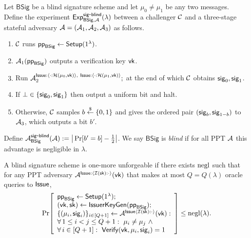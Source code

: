 \begin{definition}[Blindness]\label{def:bs-blindness}
  Let $\mathsf{BSig}$ be a blind signature scheme and let $\mu_0 \neq \mu_1$ be any two messages. Define the
  experiment $\mathsf{Exp}^{\mathsf{sig\mbox{-}blind}}_{\mathsf{BSig},\mathcal{A}}(\lambda)$ between a challenger
  $\mathcal{C}$ and a three-stage stateful adversary $\mathcal{A}=(\mathcal{A}_1,\mathcal{A}_2,\mathcal{A}_3)$ as follows.
 \begin{enumerate}[leftmargin=1.25em]
   \item $\mathcal{C}$ runs $\mathsf{pp}_{\mathsf{BSig}}\gets \mathsf{Setup}(1^\lambda)$.
   \item $\mathcal{A}_1(\mathsf{pp}_{\mathsf{BSig}})$ outputs a verification key $\mathsf{vk}$.
	   \item Run
			$\mathcal{A}_2^{\mathsf{Issue}:\langle \cdot: \mathcal{H}(\mu_0,\mathsf{vk})\rangle ,~ \mathsf{Issue}:\langle
	    \cdot: \mathcal{H}(\mu_1,\mathsf{vk})\rangle };$
	     at the end of which $\mathcal{C}$ obtains $\mathsf{sig}_0,\mathsf{sig}_1$.
	   \item If $\bot\in\{\mathsf{sig}_0,\mathsf{sig}_1\}$ then output a uniform bit and halt.
	   \item Otherwise, $\mathcal{C}$ samples $b\overset{\$}{\leftarrow}\{0,1\}$ and gives the ordered pair
	   \((\mathsf{sig}_b,\mathsf{sig}_{1-b})\) to $\mathcal{A}_3$, which
	   outputs a bit $b'$.
	 \end{enumerate}
 Define $\mathcal{A}^{\mathsf{sig\mbox{-}blind}}_{\mathsf{BSig}}(\mathcal{A}) := \big|\Pr[b'=b]-\tfrac12\big|$.
 We say $\mathsf{BSig}$ is \emph{blind} if for all PPT $\mathcal{A}$ this advantage is negligible in $\lambda$.
\end{definition}



\begin{definition}\label{def:bs-euf-cma}
A blind signature scheme is one-more unforgeable if there exists \(\mathrm{negl}\) such that for any PPT adversary
\(\mathcal{A}^{\mathsf{Issue}: \langle \mathcal{I}(\mathsf{sk}): \cdot \rangle}(\mathsf{vk})\) that makes at most \(Q=Q(\lambda)\) oracle queries to \(\mathsf{Issue}\),
\[
  \Pr\!\left[
    \begin{array}{l}
     	\mathsf{pp}_{\mathsf{BSig}} \gets \mathsf{Setup}(1^\lambda); \\
      (\mathsf{vk},\mathsf{sk})\gets \mathsf{IssuerKeyGen}(\mathsf{pp}_{\mathsf{BSig}});\\
      \{(\mu_i,\mathsf{sig}_i)\}_{i\in[Q+1]}\gets \mathcal{A}^{\mathsf{Issue} \langle \mathcal{I}(\mathsf{sk}):\cdot \rangle}(\mathsf{vk}):\\
      \forall\,1\le i<j\le Q+1:\ \mu_i\neq \mu_j\ \land\ \\ \forall\,i\in[Q+1]:\ \mathsf{Verify}(\mathsf{vk},\mu_i,\mathsf{sig}_i)=1
    \end{array}
  \right]
  \le \mathrm{negl}(\lambda).
\]
\end{definition}

